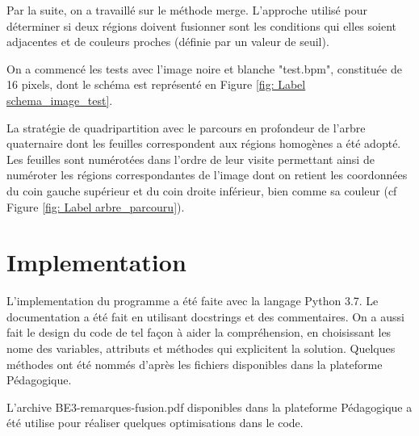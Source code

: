 \documentclass{rapportECL}
\begin{document}
Par la suite, on a travaillé sur le méthode merge.
L'approche utilisé pour déterminer si deux régions doivent fusionner sont les conditions qui elles soient adjacentes et de couleurs proches (définie par un valeur de seuil).

On a commencé les tests avec l'image noire et blanche "test.bpm", constituée de 16 pixels, dont le schéma est représenté en Figure \ref{fig: Label schema_image_test}.


La stratégie de quadripartition avec le parcours en profondeur de l'arbre quaternaire dont les feuilles correspondent aux régions homogènes a été adopté. Les feuilles sont numérotées dans l'ordre de leur visite permettant ainsi de numéroter les régions correspondantes de l'image dont on retient les coordonnées du coin gauche supérieur et du coin droite inférieur, bien comme sa couleur (cf Figure \ref{fig: Label arbre_parcouru}).



\section{Implementation}

L'implementation du programme a été faite avec la langage Python 3.7. Le documentation a été fait en utilisant docstrings et des commentaires. On a aussi fait le design du code de tel façon  à aider la compréhension, en choisissant les nome des variables, attributs et méthodes qui explicitent la solution. Quelques méthodes ont été nommés d'après les fichiers disponibles dans la plateforme Pédagogique.

L'archive BE3-remarques-fusion.pdf disponibles dans la plateforme Pédagogique a été utilise pour réaliser quelques optimisations dans le code.
\end{document}
